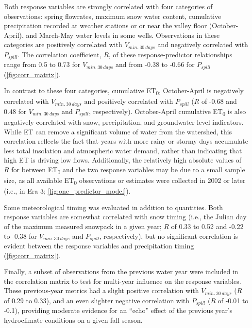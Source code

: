 \documentclass[
]{article}
\begin{document}
Both response variables are strongly correlated with four categories of
observations: spring flowrates, maximum snow water content, cumulative
precipitation recorded at weather stations or or near the valley floor
(October-April), and March-May water levels in some wells. Observations
in these categories are positively correlated with \(V_{min.~30~days}\)
and negatively correlated with \(P_{spill}\). The correlation
coefficient, \(R\), of these response-predictor relationships range from
0.5 to 0.73 for \(V_{min.~30~days}\) and from -0.38 to -0.66 for
\(P_{spill}\) (\autoref{fig:corr_matrix}).

In contrast to these four categories, cumulative ET\textsubscript{0},
October-April is negatively correlated with \(V_{min.~30~days}\) and
positively correlated with \(P_{spill}\) (\(R\) of -0.68 and 0.48 for
\(V_{min.~30~days}\) and \(P_{spill}\), respectively). October-April
cumulative ET\textsubscript{0} is also negatively correlated with snow,
precipitation, and groundwater level indicators. While ET can remove a
significant volume of water from the watershed, this correlation
reflects the fact that years with more rainy or stormy days accumulate
less total insolation and atmospheric water demand, rather than
indicating that high ET is driving low flows. Additionally, the
relatively high absolute values of \(R\) for between ET\textsubscript{0}
and the two response variables may be due to a small sample size, as all
available ET\textsubscript{0} observations or estimates were collected
in 2002 or later (i.e., in Era 3; \autoref{fig:one_predictor_model}).

Some meteorological timing was evaluated in addition to quantities. Both
response variables are somewhat correlated with snow timing (i.e., the
Julian day of the maximum measured snowpack in a given year; \(R\) of
0.33 to 0.52 and -0.22 to -0.38 for \(V_{min.~30~days}\) and
\(P_{spill}\), respectively), but no significant correlation is evident
between the response variables and precipitation timing
(\autoref{fig:corr_matrix}).

Finally, a subset of observations from the previous water year were
included in the correlation matrix to test for multi-year influence on
the response variables. These previous-year metrics had a slight
positive correlation with \(V_{min.~30~days}\) (\(R\) of 0.29 to 0.33),
and an even slighter negative correlation with \(P_{spill}\) (\(R\) of
-0.01 to -0.1), providing moderate evidence for an ``echo'' effect of
the previous year's hydroclimate conditions on a given fall season.
\end{document}
